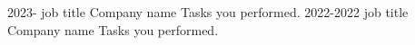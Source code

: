 

\begin{cvskills}

 \cvexp
    {2023-    } %
    {job title} %
    {Company name}
    {Tasks you performed.}
  \cvexp
    {2022-2022} %
    {job title} %
    {Company name}
    {Tasks you performed.}

\end{cvskills}
